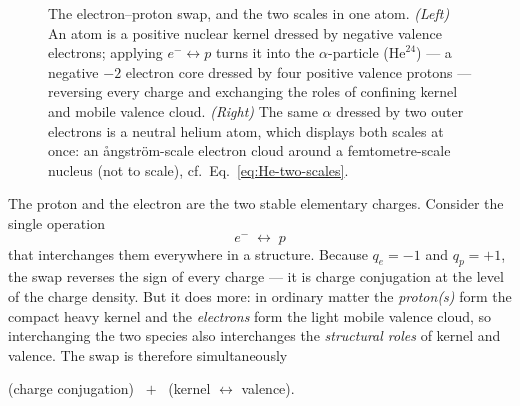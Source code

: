 \documentclass[11pt]{article}
\begin{document}
\begin{figure}[t]
\caption{The electron--proton swap, and the two scales in one atom. \emph{(Left)} An atom is a positive
nuclear kernel dressed by negative valence electrons; applying $e^-\!\leftrightarrow p$ turns it into
the $\alpha$-particle ($\mathrm{He}^{24}$) --- a negative $-2$ electron core dressed by four positive
valence protons --- reversing every charge and exchanging the roles of confining kernel and mobile
valence cloud. \emph{(Right)} The same $\alpha$ dressed by two outer electrons is a neutral helium
atom, which displays both scales at once: an {\aa}ngstr\"om-scale electron cloud around a
femtometre-scale nucleus (not to scale), cf.\ Eq.~\eqref{eq:He-two-scales}.}
\label{fig:swap}
\end{figure}

The proton and the electron are the two stable elementary charges. Consider the single operation
\begin{equation}
\boxed{\;e^-\;\longleftrightarrow\;p\;}
\end{equation}
that interchanges them everywhere in a structure. Because $q_{e}=-1$ and $q_{p}=+1$, the swap reverses
the sign of every charge --- it is charge conjugation at the level of the charge density. But it does
more: in ordinary matter the \emph{proton(s)} form the compact heavy kernel and the \emph{electrons}
form the light mobile valence cloud, so interchanging the two species also interchanges the
\emph{structural roles} of kernel and valence. The swap is therefore simultaneously
\begin{center}
(charge conjugation) $\;+\;$ (kernel $\leftrightarrow$ valence).
\end{center}
\end{document}
